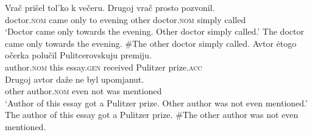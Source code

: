 \documentclass[output=paper]{langscibook}
\begin{document}

\ea \label{ex:seres:25}
\ea \gll	Vrač			prišel	tol'ko		k	večeru.	Drugoj	vrač				prosto	pozvonil.\\
doctor.\textsc{nom}	came only 		to	evening 	other   	doctor.\textsc{nom}		simply 	called\\
\glt `Doctor came only towards the evening. Other doctor simply called.'
\ex The doctor came only towards the evening. \#The other doctor simply called.
\z\ex \label{ex:seres:26}
\ea\gll	Avtor	ėtogo		očerka		polučil	Pulitcerovskuju	premiju. \\
          author.\textsc{nom} this		essay.\textsc{gen} 	received Pulitzer prize.\textsc{acc}\\
\gll Drugoj	avtor				daže	ne		byl	upomjanut.\\
         	other		author.\textsc{nom}	 	even	not	was	mentioned\\
\glt `Author of this essay got a Pulitzer prize. Other author was not even mentioned.'
\ex The author of this essay got a Pulitzer prize. \#The other author was not even mentioned.
\z\z
\end{document}

